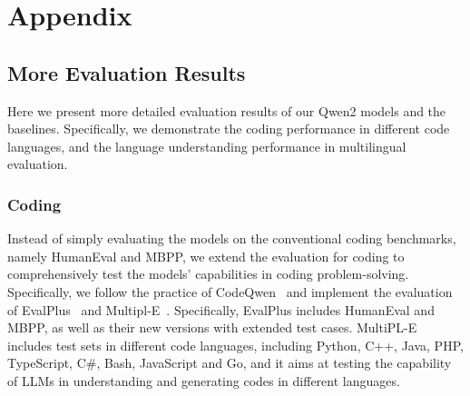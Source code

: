 \section{Appendix}
\label{sec:appendix}

\subsection{More Evaluation Results}

Here we present more detailed evaluation results of our Qwen2 models and the baselines. Specifically, we demonstrate the coding performance in different code languages, and the language understanding performance in multilingual evaluation.

\subsubsection{Coding}

Instead of simply evaluating the models on the conventional coding benchmarks, namely HumanEval and MBPP, we extend the evaluation for coding to comprehensively test the models' capabilities in coding problem-solving. Specifically, we follow the practice of CodeQwen~\citep{codeqwen} and implement the evaluation of EvalPlus~\citep{evalplus} and Multipl-E~\citep{multiple}. Specifically, EvalPlus includes HumanEval and MBPP, as well as their new versions with extended test cases. MultiPL-E includes test sets in different code languages, including Python, C++, Java, PHP, TypeScript, C\#, Bash, JavaScript and Go, and it aims at testing the capability of LLMs in understanding and generating codes in different languages.


